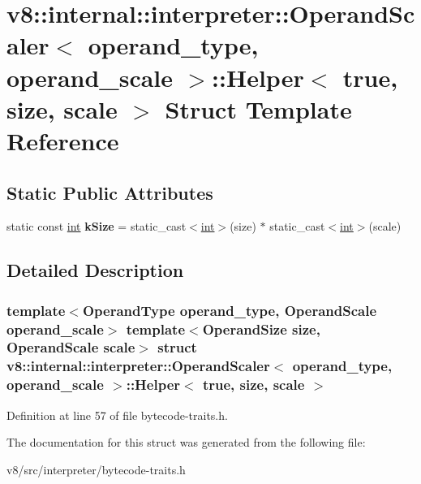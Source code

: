 \hypertarget{structv8_1_1internal_1_1interpreter_1_1OperandScaler_1_1Helper_3_01true_00_01size_00_01scale_01_4}{}\section{v8\+:\+:internal\+:\+:interpreter\+:\+:Operand\+Scaler$<$ operand\+\_\+type, operand\+\_\+scale $>$\+:\+:Helper$<$ true, size, scale $>$ Struct Template Reference}
\label{structv8_1_1internal_1_1interpreter_1_1OperandScaler_1_1Helper_3_01true_00_01size_00_01scale_01_4}
\subsection*{Static Public Attributes}
\begin{DoxyCompactItemize}
\item 
\mbox{\label{structv8_1_1internal_1_1interpreter_1_1OperandScaler_1_1Helper_3_01true_00_01size_00_01scale_01_4_a0cad4c2ae1078a3e43dc74904b973f2f}} 
static const \mbox{\hyperlink{classint}{int}} {\bfseries k\+Size} = static\+\_\+cast$<$\mbox{\hyperlink{classint}{int}}$>$(size) $\ast$ static\+\_\+cast$<$\mbox{\hyperlink{classint}{int}}$>$(scale)
\end{DoxyCompactItemize}


\subsection{Detailed Description}
\subsubsection*{template$<$Operand\+Type operand\+\_\+type, Operand\+Scale operand\+\_\+scale$>$\newline
template$<$Operand\+Size size, Operand\+Scale scale$>$\newline
struct v8\+::internal\+::interpreter\+::\+Operand\+Scaler$<$ operand\+\_\+type, operand\+\_\+scale $>$\+::\+Helper$<$ true, size, scale $>$}



Definition at line 57 of file bytecode-\/traits.\+h.



The documentation for this struct was generated from the following file\+:\begin{DoxyCompactItemize}
\item 
v8/src/interpreter/bytecode-\/traits.\+h\end{DoxyCompactItemize}
